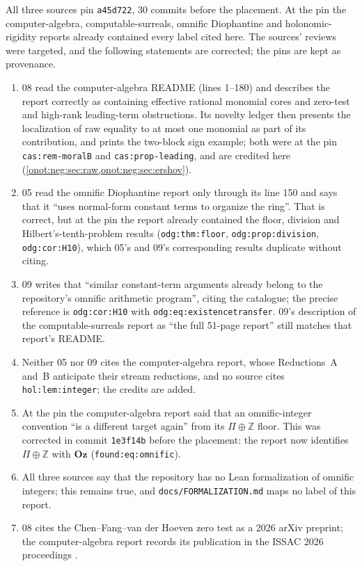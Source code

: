 \documentclass[11pt,oneside]{article}
\numberwithin{equation}{section}
\theoremstyle{definition}
\theoremstyle{remark}
\newcommand{\Oz}{\mathbf{Oz}}
\newcommand{\Z}{\mathbb Z}
\newcommand{\replabel}[1]{\nolinkurl{#1}}
\newcommand{\fn}[1]{\nolinkurl{#1}}
\begin{document}
All three sources pin \texttt{a45d722}, 30 commits before the placement. At the pin
the computer-algebra, computable-surreals, omnific Diophantine and
holonomic-rigidity reports already contained every label cited here. The sources'
reviews were targeted, and the following statements are corrected; the pins are
kept as provenance.
\begin{enumerate}[leftmargin=*]
\item 08 read the computer-algebra README (lines 1--180) and describes the report
correctly as containing effective rational monomial cores and zero-test and
high-rank leading-term obstructions. Its novelty ledger then presents the
localization of raw equality to at most one monomial as part of its contribution,
and prints the two-block sign example; both were at the pin
\replabel{cas:rem-moralB} and \replabel{cas:prop-leading}, and are credited here
(\cref{onot:neg:sec:raw,onot:neg:sec:ershov}).
\item 05 read the omnific Diophantine report only through its line 150 and says
that it ``uses normal-form constant terms to organize the ring''. That is correct,
but at the pin the report already contained the floor, division and
Hilbert's-tenth-problem results (\replabel{odg:thm:floor},
\replabel{odg:prop:division}, \replabel{odg:cor:H10}), which 05's and 09's
corresponding results duplicate without citing.
\item 09 writes that ``similar constant-term arguments already belong to the
repository's omnific arithmetic program'', citing the catalogue; the precise
reference is \replabel{odg:cor:H10} with \replabel{odg:eq:existencetransfer}.
09's description of the computable-surreals report as ``the full 51-page report''
still matches that report's README.
\item Neither 05 nor 09 cites the computer-algebra report, whose Reductions~A and~B
anticipate their stream reductions, and no source cites
\replabel{hol:lem:integer}; the credits are added.
\item At the pin the computer-algebra report said that an omnific-integer
convention ``is a different target again'' from its $\Pi\oplus\Z$ floor. This was
corrected in commit \texttt{1e3f14b} before the placement: the report now
identifies $\Pi\oplus\Z$ with $\Oz$ (\replabel{found:eq:omnific}).
\item All three sources say that the repository has no Lean formalization of
omnific integers; this remains true, and \fn{docs/FORMALIZATION.md} maps no label of
this report.
\item 08 cites the Chen--Fang--van der Hoeven zero test as a 2026 arXiv preprint;
the computer-algebra report records its publication in the ISSAC 2026 proceedings
\cite{CFH}.
\end{enumerate}
\end{document}
